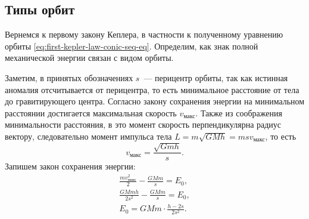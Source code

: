 \subsection{Типы орбит}
\label{sec:orbit-types}

Вернемся к первому закону Кеплера, в частности к полученному уравнению орбиты \eqref{eq:first-kepler-law-conic-seq-eq}. Определим, как знак полной механической энергии связан с видом орбиты. 

Заметим, в принятых обозначениях $s$~--- перицентр орбиты, так как истинная аномалия отсчитывается от перицентра, то есть минимальное расстояние от тела до гравитирующего центра. Согласно закону сохранения энергии на минимальном расстоянии достигается максимальная скорость $v_\text{макс}$. Также из соображения минимальности расстояния, в это момент скорость перпендикулярна радиус вектору, следовательно момент импульса тела $L = m\sqrt{GMh} =  m s v_\text{макс}$, то есть
\begin{equation*}
     v_\text{макс} = \frac{\sqrt{Gmh}}{s}.
\end{equation*}
Запишем закон сохранения энергии:
\begin{gather*}
     \frac{m v_\text{макс}^2}{2} - \frac{GMm}{s} = E_0,\\
     \frac{GMmh}{2s^2} - \frac{GMm}{s} = E_0,\\
     E_0 = GMm \cdot \frac{h - 2s}{2s^2}.
\end{gather*}
 

